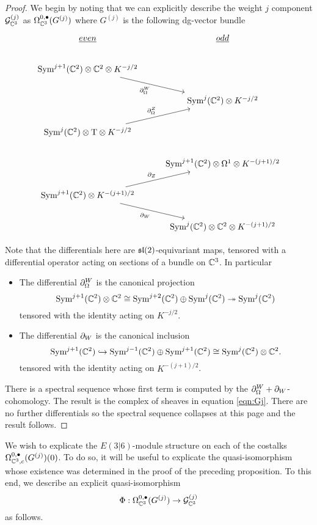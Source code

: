 \begin{proof}
We begin by noting that we can explicitly describe the weight $j$ component $\mathcal{G}^{(j)}_{\mathbb{C}^3}$ as $\Omega^{0,\bullet}_{\mathbb{C}^3} (G^{(j)})$ where $G^{(j)}$ is the following dg-vector bundle
\begin{equation}
\begin{tikzcd}
\ul{even} & \ul{odd} \\
\Sym^{j+1}(\C^2) \otimes \C^2 \ar[dr, "\del^W_\Omega"'] \otimes K^{-j/2}\\ 
& \Sym^j (\C^2) \otimes K^{-j/2} \\ 
\Sym^j (\C^2) \otimes  \T \otimes K^{-j/2} \ar[ur, "\del^Z_\Omega"]  & \\
& \Sym^{j+1}(\C^2)  \otimes  \Omega^1 \otimes K^{-(j+1)/2} \\ 
\Sym^{j+1}(\C^2) \otimes K^{-(j+1)/2} \ar[ur, "\del_Z"] \ar[dr, "\del_W"'] \\
& \Sym^j(\C^2) \otimes \C^2\otimes K^{-(j+1)/2} 
\end{tikzcd}
\end{equation}

Note that the differentials here are $\mathfrak{sl}(2)$-equivariant maps, tensored with a differential operator acting on sections of a bundle on $\mathbb{C}^3$. In particular

\begin{itemize}
\item The differential $\partial^W_\Omega$ is the canonical projection \[\text{Sym}^{j+1}(\mathbb{C}^2) \otimes \mathbb{C}^2 \cong \text{Sym}^{j+2} (\mathbb{C}^2) \oplus \text{Sym} ^j (\mathbb{C}^2) \twoheadrightarrow \text{Sym}^j (\mathbb{C}^2)\] tensored with the identity acting on $K^{-j/2}$. 

\item The differential $\partial_W$ is the canonical inclusion \[\text{Sym}^{j+1}(\mathbb{C}^2) \hookrightarrow \text{Sym}^{j-1}(\mathbb{C}^2) \oplus \text{Sym}^{j+1}(\mathbb{C}^2) \cong \text{Sym}^j(\mathbb{C}^2) \otimes \mathbb{C}^2 .\] tensored with the identity acting on $K^{-(j+1)/2}$.
\end{itemize}

There is a spectral sequence whose first term is computed by the $\partial^W_\Omega +\partial_W$-cohomology. The result is the complex of sheaves in equation \ref{eqn:Gj}. There are no further differentials so the spectral sequence collapses at this page and the result follows.
\end{proof}

\iffalse
\parsec[]
We wish to explicate the $E(3|6)$-module structure on each of the costalks $\Omega^{0,\bullet}_{\mathbb{C}^3, c} (G^{(j)} )(0)$. To do so, it will be useful to explicate the quasi-isomorphism whose existence was determined in the proof of the preceding proposition. To this end, we describe an explicit quasi-isomorphism 
\[\Phi: \Omega^{0,\bullet}_{\mathbb{C}^3} (G^{(j)} ) \to \mathcal{G}^{(j)}_{\mathbb{C}^3}\] 
as follows. 

